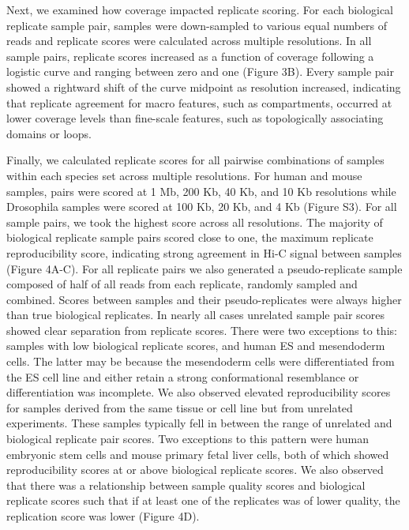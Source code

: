 
Next, we examined how coverage impacted replicate scoring. For each biological replicate sample pair, samples were down-sampled to various equal numbers of reads and replicate scores were calculated across multiple resolutions. In all sample pairs, replicate scores increased as a function of coverage following a logistic curve and ranging between zero and one (Figure 3B). Every sample pair showed a rightward shift of the curve midpoint as resolution increased, indicating that replicate agreement for macro features, such as compartments, occurred at lower coverage levels than fine-scale features, such as topologically associating domains or loops.

Finally, we calculated replicate scores for all pairwise combinations of samples within each species set across multiple resolutions. For human and mouse samples, pairs were scored at 1 Mb, 200 Kb, 40 Kb, and 10 Kb resolutions while Drosophila samples were scored at 100 Kb, 20 Kb, and 4 Kb (Figure S3). For all sample pairs, we took the highest score across all resolutions. The majority of biological replicate sample pairs scored close to one, the maximum replicate reproducibility score, indicating strong agreement in Hi-C signal between samples (Figure 4A-C). For all replicate pairs we also generated a pseudo-replicate sample composed of half of all reads from each replicate, randomly sampled and combined. Scores between samples and their pseudo-replicates were always higher than true biological replicates. In nearly all cases unrelated sample pair scores showed clear separation from replicate scores. There were two exceptions to this: samples with low biological replicate scores, and human ES and mesendoderm cells. The latter may be because the mesendoderm cells were differentiated from the ES cell line and either retain a strong conformational resemblance or differentiation was incomplete. We also observed elevated reproducibility scores for samples derived from the same tissue or cell line but from unrelated experiments. These samples typically fell in between the range of unrelated and biological replicate pair scores. Two exceptions to this pattern were human embryonic stem cells and mouse primary fetal liver cells, both of which showed reproducibility scores at or above biological replicate scores. We also observed that there was a relationship between sample quality scores and biological replicate scores such that if at least one of the replicates was of lower quality, the replication score was lower (Figure 4D).

